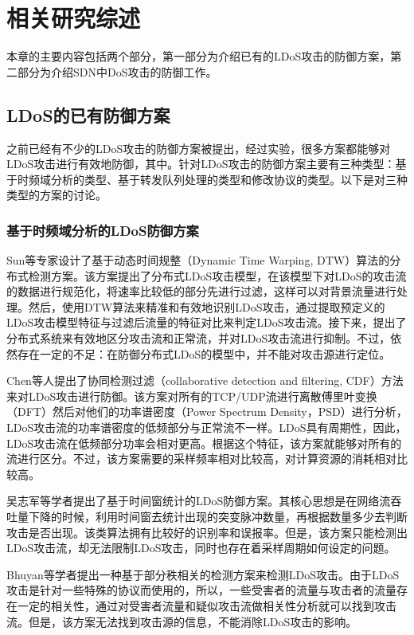 \chapter{相关研究综述}
\label{cha:relatedWork}

本章的主要内容包括两个部分，第一部分为介绍已有的LDoS攻击的防御方案，第二部分为介绍SDN中DoS攻击的防御工作。

\section{LDoS的已有防御方案}
\label{chap2:LDoSwork}
之前已经有不少的LDoS攻击的防御方案被提出，经过实验，很多方案都能够对LDoS攻击进行有效地防御，其中。针对LDoS攻击的防御方案主要有三种类型：基于时频域分析的类型、基于转发队列处理的类型和修改协议的类型。以下是对三种类型的方案的讨论。


\subsection{基于时频域分析的LDoS防御方案}
\label{chap2:TFanalysis}

Sun\cite{b4}等专家设计了基于动态时间规整（Dynamic Time Warping, DTW）算法的分布式检测方案。该方案提出了分布式LDoS攻击模型，在该模型下对LDoS的攻击流的数据进行规范化，将速率比较低的部分先进行过滤，这样可以对背景流量进行处理。然后，使用DTW算法来精准和有效地识别LDoS攻击，通过提取预定义的LDoS攻击模型特征与过滤后流量的特征对比来判定LDoS攻击流。接下来，提出了分布式系统来有效地区分攻击流和正常流，并对LDoS攻击流进行抑制。不过，依然存在一定的不足：在防御分布式LDoS的模型中，并不能对攻击源进行定位。

Chen\cite{b7}等人提出了协同检测过滤（collaborative detection and filtering, CDF）方法来对LDoS攻击进行防御。该方案对所有的TCP/UDP流进行离散傅里叶变换（DFT）然后对他们的功率谱密度（Power Spectrum Density，PSD）进行分析，LDoS攻击流的功率谱密度的低频部分与正常流不一样。LDoS具有周期性，因此，LDoS攻击流在低频部分功率会相对更高。根据这个特征，该方案就能够对所有的流进行区分。不过，该方案需要的采样频率相对比较高，对计算资源的消耗相对比较高。

吴志军\cite{wuLDoSdetect}等学者提出了基于时间窗统计的LDoS防御方案。其核心思想是在网络流吞吐量下降的时候，利用时间窗去统计出现的突变脉冲数量，再根据数量多少去判断攻击是否出现。该类算法拥有比较好的识别率和误报率。但是，该方案只能检测出LDoS攻击流，却无法限制LDoS攻击，同时也存在着采样周期如何设定的问题。

Bhuyan\cite{bhuyan2015low}等学者提出一种基于部分秩相关的检测方案来检测LDoS攻击。由于LDoS攻击是针对一些特殊的协议而使用的，所以，一些受害者的流量与攻击者的流量存在一定的相关性，通过对受害者流量和疑似攻击流做相关性分析就可以找到攻击流。但是，该方案无法找到攻击源的信息，不能消除LDoS攻击的影响。

